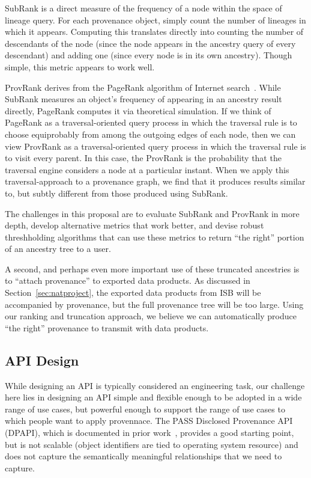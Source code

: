 \documentclass[10pt]{article}
\begin{document}
SubRank is a direct measure of the frequency of a node
within the space of lineage query.
For each provenance object, simply count the number of lineages in
which it appears.
Computing this translates directly into counting
the number of descendants of the node (since the node appears in
the ancestry query of every descendant) and adding one (since every node
is in its own ancestry).
Though simple, this metric appears to work well.

ProvRank derives from the PageRank algorithm of Internet
search~\cite{pagerank}.
While SubRank measures an object's frequency of appearing in an ancestry
result directly, PageRank computes it via theoretical simulation.
If we think of PageRank as a traversal-oriented query process
in which the traversal rule is to choose equiprobably from
among the outgoing edges of each node, then we can view ProvRank as
a traversal-oriented query process in which the traversal rule is to visit
every parent.
In this case, the ProvRank is the probability that the traversal engine
considers a node at a particular instant.
When we apply this traversal-approach to a provenance graph, we find that
it produces results similar to, but subtly different from those produced
using SubRank.

The challenges in this proposal are to evaluate SubRank and ProvRank in
more depth, develop alternative metrics that work better, and devise
robust threshholding algorithms that can use these metrics to return
``the right'' portion of an ancestry tree to a user.

A second, and perhaps even more important use of these truncated
ancestries is to ``attach provenance'' to exported data products.
As discussed in Section~\ref{sec:natproject}, the exported data products
from ISB will be accompanied by provenance, but the full provenance tree
will be too large.
Using our ranking and truncation approach, we believe we can automatically
produce ``the right'' provenance to transmit with data products.

\subsection{API Design}
\label{sec:api}

While designing an API is typically considered an engineering task, our
challenge here lies in designing an API simple and flexible enough to be
adopted in a wide range of use cases, but powerful enough to support the
range of use cases to which people want to apply provennace.
The PASS Disclosed Provenance API (DPAPI), which is documented in prior
work~\cite{pass-usenix09},
provides a good starting point, but is not scalable (object identifiers
are tied to operating system resource) and does not capture the semantically
meaningful relationships that we need to capture.
\end{document}
